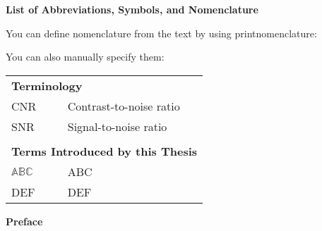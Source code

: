 \documentclass[
  12pt,
  oneside]{book}
\numberwithin{figure}{chapter}
\newenvironment{preliminary}%
{\pagestyle{plain}\pagenumbering{roman}}%
{\pagenumbering{arabic}}
\begin{document}
\begin{preliminary}
\vfill
\newpage
\singlespacing



\tableofcontents\newpage
\newpage
{}
\listoffigures
\newpage
{}
\listofalgorithms
{}
\newpage
{}
\listoftables
\newpage
{}
\listofmyappendices\newpage

\Large \textbf{List of Abbreviations, Symbols, and Nomenclature} \normalsize

You can define nomenclature from the text by using printnomenclature:
\printnomenclature

You can also manually specify them:

\begin{tabular}{lcl}
\\
\multicolumn{3}{l}{\textbf{Terminology}}\\
CNR & & Contrast-to-noise ratio \\
SNR & \, & Signal-to-noise ratio \\
\\
\multicolumn{3}{l}{\textbf{Terms Introduced by this Thesis}}\\
$\mathbb{ABC}$ && ABC \\
DEF & \, & DEF \\
\end{tabular}

\newpage

\clearpage

\Large\begin{center}\textbf{Preface}\end{center}\normalsize
\onehalfspacing
%

\newpage

% 
% 
% 
% 
% 
% 

\end{preliminary}
\end{document}
